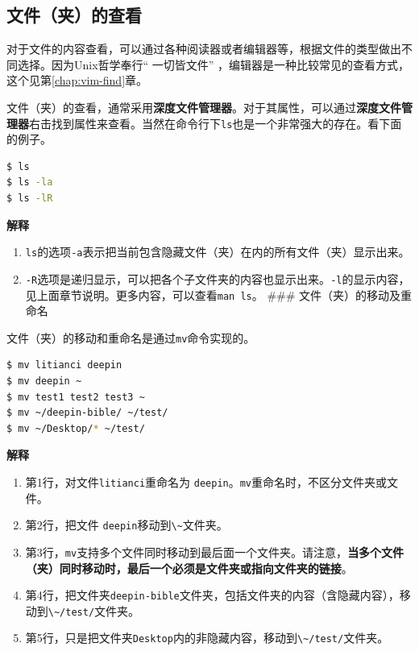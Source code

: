 \documentclass[doctor,openright,twoside]{sjtuthesis}
\providecommand{\tightlist}{%
    \setlength{\itemsep}{0pt}\setlength{\parskip}{0pt}}
\newcommand{\passthrough}[1]{#1}
\theoremstyle{plain}
\theoremstyle{definition}
\theoremstyle{remark}
\theoremstyle{ocrenumbox}
\theoremstyle{plain}
\begin{document}
\hypertarget{section-71}{%
\subsection{文件（夹）的查看}\label{section-71}}

对于文件的内容查看，可以通过各种阅读器或者编辑器等，根据文件的类型做出不同选择。因为Unix哲学奉行`` 一切皆文件'' ，编辑器是一种比较常见的查看方式，这个见第\ref{chap:vim-find}章。

文件（夹）的查看，通常采用\textbf{深度文件管理器}。对于其属性，可以通过\textbf{深度文件管理器}右击找到属性来查看。当然在命令行下\passthrough{\lstinline!ls!}也是一个非常强大的存在。看下面的例子。

\begin{lstlisting}[language=bash]
$ ls
$ ls -la
$ ls -lR
\end{lstlisting}

\textbf{解释}

\begin{enumerate}
\def\labelenumi{\arabic{enumi}.}
\tightlist
\item
  \passthrough{\lstinline!ls!}的选项\passthrough{\lstinline!-a!}表示把当前包含隐藏文件（夹）在内的所有文件（夹）显示出来。
\item
  \passthrough{\lstinline!-R!}选项是递归显示，可以把各个子文件夹的内容也显示出来。\passthrough{\lstinline!-l!}的显示内容，见上面章节说明。更多内容，可以查看\passthrough{\lstinline!man ls!}。
  \#\#\# 文件（夹）的移动及重命名
\end{enumerate}

文件（夹）的移动和重命名是通过\passthrough{\lstinline!mv!}命令实现的。

\begin{lstlisting}[language=bash]
$ mv litianci deepin
$ mv deepin ~
$ mv test1 test2 test3 ~
$ mv ~/deepin-bible/ ~/test/
$ mv ~/Desktop/* ~/test/
\end{lstlisting}

\textbf{解释}

\begin{enumerate}
\def\labelenumi{\arabic{enumi}.}
\tightlist
\item
  第1行，对文件\passthrough{\lstinline!litianci!}重命名为 \passthrough{\lstinline!deepin!}。\passthrough{\lstinline!mv!}重命名时，不区分文件夹或文件。
\item
  第2行，把文件 \passthrough{\lstinline!deepin!}移动到\passthrough{\lstinline!\~!}文件夹。
\item
  第3行，\passthrough{\lstinline!mv!}支持多个文件同时移动到最后面一个文件夹。请注意，\textbf{当多个文件（夹）同时移动时，最后一个必须是文件夹或指向文件夹的链接}。
\item
  第4行，把文件夹\passthrough{\lstinline!deepin-bible!}文件夹，包括文件夹的内容（含隐藏内容），移动到\passthrough{\lstinline!\~/test/!}文件夹。
\item
  第5行，只是把文件夹\passthrough{\lstinline!Desktop!}内的非隐藏内容，移动到\passthrough{\lstinline!\~/test/!}文件夹。
\end{enumerate}
\end{document}
